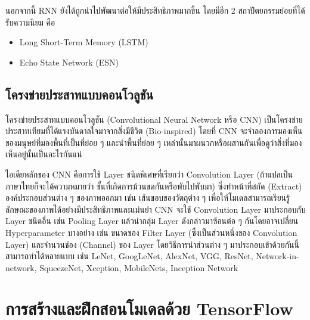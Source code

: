 นอกจากนี้ RNN ยังได้ถูกนำไปพัฒนาต่อให้มีประสิทธิภาพมากขึ้น โดยมีอีก 2 สถาปัตยกรรมย่อยที่ได้รับความนิยม คือ
%
\begin{itemize}[topsep=0pt,noitemsep]\setlength\itemsep{0.5em}
    \item Long Short-Term Memory (LSTM)\autocite{hochreiter1997a}
    \item Echo State Network (ESN)\autocite{jaeger2004}
\end{itemize}

\subsection{โครงข่ายประสาทแบบคอนโวลูชัน}
\label{ssec:cnn}

โครงข่ายประสาทแบบคอนโวลูชัน (Convolutional Neural Network หรือ CNN)\autocite{alzubaidi2021} เป็นโครงข่ายประสาทเทียมที่ได้แรงบันดาลใจมาจากสิ่งมีชีวิต (Bio-inspired) โดยที่ CNN จะจำลองการมองเห็นของมนุษย์ที่มองพื้นที่เป็นที่ย่อย ๆ และนำพื้นที่ย่อย ๆ
เหล่านั้นมาผนวกหรือผสานกันเพื่อดูว่าสิ่งที่มองเห็นอยู่นั้นเป็นอะไรกันแน่

ไอเดียหลักของ CNN คือการใช้ Layer ชนิดพิเศษที่เรียกว่า Convolution Layer (ถ้าแปลเป็นภาษาไทยก็จะได้ความหมายว่า ชั้นที่เกิดการม้วนขดกันหรือพับไปพับมา) ซึ่งทำหน้าที่สกัด (Extract) องค์ประกอบส่วนต่าง ๆ ของภาพออกมา เช่น เส้นขอบของวัตถุต่าง ๆ เพื่อให้โมเดลสามารถเรียนรู้ลักษณะของภาพได้อย่างมีประสิทธิภาพและแม่นยำ CNN จะใช้ Convolution Layer มาประกอบกับ Layer ชนิดอื่น เช่น Pooling Layer
แล้วนำกลุ่ม Layer ดังกล่าวมาซ้อนต่อ ๆ กันโดยอาจเปลี่ยน Hyperparameter บางอย่าง เช่น ขนาดของ Filter Layer (ซึ่งเป็นส่วนหนึ่งของ
Convolution Layer) และจำนวนช่อง (Channel) ของ Layer โดยวิธีการนำส่วนต่าง ๆ มาประกอบเข้าด้วยกันนี้สามารถทำได้หลายแบบ เช่น
LeNet, GoogLeNet, AlexNet, VGG, ResNet, Network-in-network, SqueezeNet, Xception, MobileNets, Inception Network

\section{การสร้างและฝึกสอนโมเดลด้วย TensorFlow}
\label{sec:train_tf}

